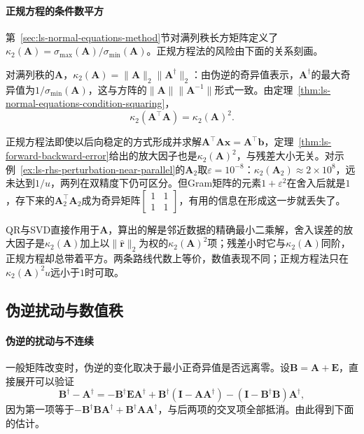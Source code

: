 \paragraph{正规方程的条件数平方}
第~\ref{sec:ls-normal-equations-method}节对满列秩长方矩阵定义了$\kappa_2(\bm A)=\sigma_{\max}(\bm A)/\sigma_{\min}(\bm A)$。正规方程法的风险由下面的关系刻画。

对满列秩的$\bm A$，$\kappa_2(\bm A)=\lVert\bm A\rVert_2\lVert\bm A^\dagger\rVert_2$：由伪逆的奇异值表示，$\bm A^\dagger$的最大奇异值为$1/\sigma_{\min}(\bm A)$，这与方阵的$\lVert\bm A\rVert\lVert\bm A^{-1}\rVert$形式一致。由定理~\ref{thm:ls-normal-equations-condition-squaring}，
\begin{equation}
 \kappa_2(\bm A^\top\bm A)=\kappa_2(\bm A)^2 .
 \label{eq:matrix-analysis-normal-equation-condition-square}
\end{equation}

正规方程法即使以后向稳定的方式形成并求解$\bm A^\top\bm A\bm x=\bm A^\top\bm b$，定理~\ref{thm:ls-forward-backward-error}给出的放大因子也是$\kappa_2(\bm A)^2$，与残差大小无关。对示例~\ref{ex:ls-rhs-perturbation-near-parallel}的$\bm A_2$取$\varepsilon=10^{-8}$：$\kappa_2(\bm A_2)\approx2\times10^8$，远未达到$1/u$，两列在双精度下仍可区分。但Gram矩阵的元素$1+\varepsilon^2$在舍入后就是$1$，存下来的$\bm A_2^\top\bm A_2$成为奇异矩阵$\left[\begin{smallmatrix}1&1\\1&1\end{smallmatrix}\right]$，有用的信息在形成这一步就丢失了。

QR与SVD直接作用于$\bm A$，算出的解是邻近数据的精确最小二乘解，舍入误差的放大因子是$\kappa_2(\bm A)$加上以$\lVert\hat{\bm r}\rVert_2$为权的$\kappa_2(\bm A)^2$项；残差小时它与$\kappa_2(\bm A)$同阶，正规方程却总带着平方。两条路线代数上等价，数值表现不同；正规方程法只在$\kappa_2(\bm A)^2u$远小于$1$时可取。

\subsection{伪逆扰动与数值秩}
\label{sec:ls-pseudoinverse-rank-change}

\paragraph{伪逆的扰动与不连续}
一般矩阵改变时，伪逆的变化取决于最小正奇异值是否远离零。设$\bm B=\bm A+\bm E$，直接展开可以验证
\[
 \bm B^\dagger-\bm A^\dagger
 =-\bm B^\dagger\bm E\bm A^\dagger+\bm B^\dagger(\bm I-\bm A\bm A^\dagger)-(\bm I-\bm B^\dagger\bm B)\bm A^\dagger ,
\]
因为第一项等于$-\bm B^\dagger\bm B\bm A^\dagger+\bm B^\dagger\bm A\bm A^\dagger$，与后两项的交叉项全部抵消。由此得到下面的估计。

